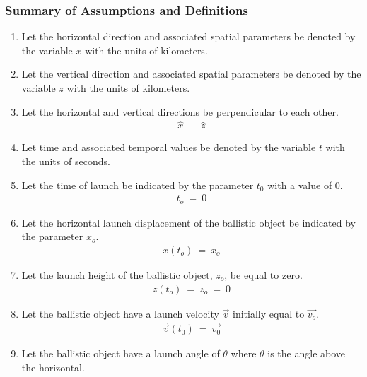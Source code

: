 \documentclass[12pt,runningheads]{article}
\begin{document}
\subsubsection*{Summary of Assumptions and Definitions}
\begin{enumerate}

\item Let the horizontal direction and associated spatial parameters be denoted by the variable $x$ with the units of kilometers.

\item Let the vertical direction and associated spatial parameters be denoted by the variable $z$ with the units of kilometers.

\item Let the horizontal and vertical directions be perpendicular to each other.
\begin{align*}
\hat{x}\ \perp\ \hat{z}
\end{align*}

\item Let time and associated temporal values be denoted by the variable $t$ with the units of seconds.

\item Let the time of launch be indicated by the parameter $t_{0}$ with a value of $0$.
\begin{align*}
t_{o}\ =\ 0
\end{align*}

\item Let the horizontal launch displacement of the ballistic object be indicated by the parameter $x_{o}$.
\begin{align*}
x(t_{o})\ =\ x_{o}
\end{align*}

\item Let the launch height of the ballistic object, $z_{o}$, be equal to zero. 
\begin{align*}
z(t_{o})\ =\ z_{o}\ =\ 0
\end{align*}

\item Let the ballistic object have a launch velocity $\vec{v}$ initially equal to $\vec{v_{o}}$.
\begin{align*}
\vec{v}(t_{0})\ =\ \vec{v_{0}}
\end{align*}

\item Let the ballistic object have a launch angle of $\theta$ where $\theta$ is the angle above the horizontal.


\end{enumerate}
\end{document}
